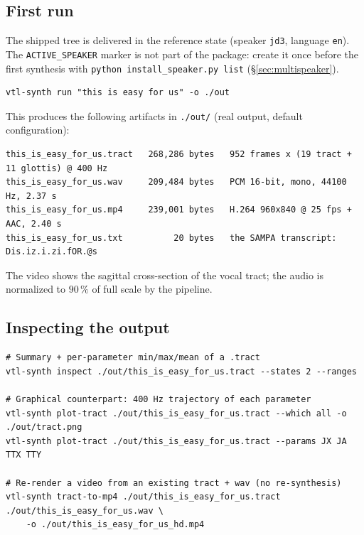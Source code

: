 \documentclass[11pt,a4paper]{article}
\begin{document}
\subsection{First run}

The shipped tree is delivered in the reference state (speaker
\texttt{jd3}, language \texttt{en}). The \texttt{ACTIVE\_SPEAKER}
marker is not part of the package: create it once before the first
synthesis with \texttt{python install\_speaker.py list}
(\S\ref{sec:multispeaker}).

\begin{lstlisting}[style=shell]
vtl-synth run "this is easy for us" -o ./out
\end{lstlisting}

This produces the following artifacts in \texttt{./out/} (real output,
default configuration):

\begin{lstlisting}[style=verbatim]
this_is_easy_for_us.tract   268,286 bytes   952 frames x (19 tract + 11 glottis) @ 400 Hz
this_is_easy_for_us.wav     209,484 bytes   PCM 16-bit, mono, 44100 Hz, 2.37 s
this_is_easy_for_us.mp4     239,001 bytes   H.264 960x840 @ 25 fps + AAC, 2.40 s
this_is_easy_for_us.txt          20 bytes   the SAMPA transcript: Dis.iz.i.zi.fOR.@s
\end{lstlisting}

The video shows the sagittal cross-section of the vocal tract; the audio
is normalized to \(90\,\%\) of full scale by the pipeline.

\subsection{Inspecting the output}

\begin{lstlisting}[style=shell]
# Summary + per-parameter min/max/mean of a .tract
vtl-synth inspect ./out/this_is_easy_for_us.tract --states 2 --ranges

# Graphical counterpart: 400 Hz trajectory of each parameter
vtl-synth plot-tract ./out/this_is_easy_for_us.tract --which all -o ./out/tract.png
vtl-synth plot-tract ./out/this_is_easy_for_us.tract --params JX JA TTX TTY

# Re-render a video from an existing tract + wav (no re-synthesis)
vtl-synth tract-to-mp4 ./out/this_is_easy_for_us.tract ./out/this_is_easy_for_us.wav \
    -o ./out/this_is_easy_for_us_hd.mp4
\end{lstlisting}
\end{document}
